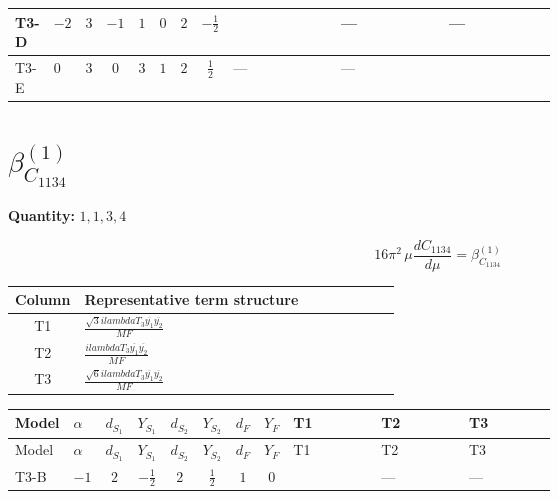 \documentclass[8pt]{article}
\begin{document}
\begin{landscape}
\begin{longtable}{@{}llcccccc >{\raggedright\arraybackslash}p{0.21\linewidth} >{\raggedright\arraybackslash}p{0.21\linewidth} >{\raggedright\arraybackslash}p{0.21\linewidth}@{}}
\midrule
T3-D & $-2$ & $3$ & $-1$ & $1$ & $0$ & $2$ & $-\frac{1}{2}$ & \scriptsize\adjustbox{max width=\linewidth}{$\begin{gathered} \frac{2 \sqrt{3} lambdaT_{3} \overline{y_{1}} \overline{y_{2}}}{3 MF}\end{gathered}$} & --- & --- \\
\midrule
T3-E & $0$ & $3$ & $0$ & $3$ & $1$ & $2$ & $\frac{1}{2}$ & --- & --- & \scriptsize\adjustbox{max width=\linewidth}{$\begin{gathered} - \frac{2 \sqrt{6} lambdaT_{3} \overline{y_{1}} \overline{y_{2}}}{3 MF}\end{gathered}$} \\
\midrule
\bottomrule
\end{longtable}
\clearpage
\section*{$\beta_{C_{1134}}^{(1)}$}
\noindent\textbf{Quantity: }$\mathrm{1,1,3,4}$\par\smallskip
\[16\pi^2\,\mu\frac{d C_{1134}}{d\mu}=\beta_{C_{1134}}^{(1)}\]
\begin{center}
\begin{tabular}{@{}c >{\raggedright\arraybackslash}p{0.82\linewidth}@{}}
\toprule
Column & Representative term structure \\
\midrule
T1 & \(\displaystyle \frac{\sqrt{3} i lambdaT_{3} \overline{y_{1}} \overline{y_{2}}}{MF}\) \\
\midrule
T2 & \(\displaystyle \frac{i lambdaT_{3} \overline{y_{1}} \overline{y_{2}}}{MF}\) \\
\midrule
T3 & \(\displaystyle \frac{\sqrt{6} i lambdaT_{3} \overline{y_{1}} \overline{y_{2}}}{MF}\) \\
\midrule
\bottomrule
\end{tabular}
\end{center}
\smallskip
\tiny
\begin{longtable}{@{}llcccccc >{\raggedright\arraybackslash}p{0.21\linewidth} >{\raggedright\arraybackslash}p{0.21\linewidth} >{\raggedright\arraybackslash}p{0.21\linewidth}@{}}
\toprule
Model & $\alpha$ & $d_{S_1}$ & $Y_{S_1}$ & $d_{S_2}$ & $Y_{S_2}$ & $d_F$ & $Y_F$ & T1 & T2 & T3 \\
\midrule
\endfirsthead
\toprule
Model & $\alpha$ & $d_{S_1}$ & $Y_{S_1}$ & $d_{S_2}$ & $Y_{S_2}$ & $d_F$ & $Y_F$ & T1 & T2 & T3 \\
\midrule
\endhead
T3-B & $-1$ & $2$ & $-\frac{1}{2}$ & $2$ & $\frac{1}{2}$ & $1$ & $0$ & \scriptsize\adjustbox{max width=\linewidth}{$\begin{gathered} \frac{2 \sqrt{3} i lambdaT_{3} \overline{y_{1}} \overline{y_{2}}}{3 MF}\end{gathered}$} & --- & --- \\

\end{longtable}
\end{landscape}
\end{document}
